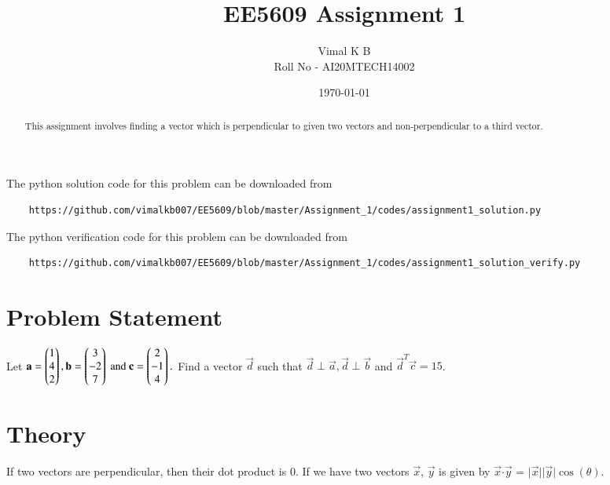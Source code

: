 \documentclass[journal,12pt,twocolumn]{IEEEtran}
\begin{document}
\title{EE5609 Assignment 1}
\author{Vimal K B \\Roll No - AI20MTECH14002}
\date{\today}

\maketitle
\newpage
\bigskip

\renewcommand{\thefigure}{\theenumi}
\renewcommand{\thetable}{\theenumi}

\begin{abstract}
	This assignment involves finding a vector which is perpendicular to given two vectors and non-perpendicular to a third vector. 
\end{abstract}

The python solution code for this problem can be downloaded from

\begin{lstlisting}
	https://github.com/vimalkb007/EE5609/blob/master/Assignment_1/codes/assignment1_solution.py
\end{lstlisting}

The python verification code for this problem can be downloaded from

\begin{lstlisting}
	https://github.com/vimalkb007/EE5609/blob/master/Assignment_1/codes/assignment1_solution_verify.py
\end{lstlisting}

\section{\textbf{Problem Statement}}
	Let 
	$
	\mathbf{a}=\begin{pmatrix}1\\4\\2\end{pmatrix},
	\mathbf{b}=\begin{pmatrix}3\\-2\\7\end{pmatrix} \text{ and }
	\mathbf{c}=\begin{pmatrix}2\\-1\\4\end{pmatrix}.
	$
	Find a vector $\vec{d}$ such that $\vec{d}\perp\vec{a},\vec{d}\perp\vec{b}$ and $\vec{d}^T\vec{c} = 15$.
	
\section{\textbf{Theory}}

	If two vectors are perpendicular, then their dot product is 0.
	If we have two vectors $\vec{x}$, $\vec{y}$ is given by 
		$\vec{x}$$\cdot$$\vec{y}$ = $|$$\vec{x}$$|$$|$$\vec{y}$$|$$\cos(\theta)$.
	
\end{document}
